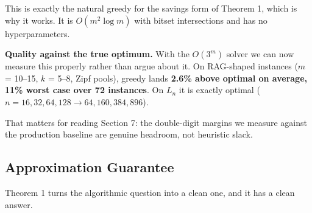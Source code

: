 \documentclass[11pt]{article}
\theoremstyle{plain}
\begin{document}
This is exactly the natural greedy for the savings form of Theorem 1, which is why it works. It is $O(m^2\log m)$ with bitset intersections and has no hyperparameters.

\textbf{Quality against the true optimum.} With the $O(3^m)$ solver we can now measure this properly rather than argue about it. On RAG-shaped instances ($m$ = 10--15, $k$ = 5--8, Zipf pools), greedy lands \textbf{2.6\% above optimal on average, 11\% worst case over 72 instances}. On $L_n$ it is exactly optimal ($n = 16, 32, 64, 128 \to 64, 160, 384, 896$).

That matters for reading Section 7: the double-digit margins we measure against the production baseline are genuine headroom, not heuristic slack.


\subsection{Approximation Guarantee}

Theorem 1 turns the algorithmic question into a clean one, and it has a clean answer.
\end{document}
